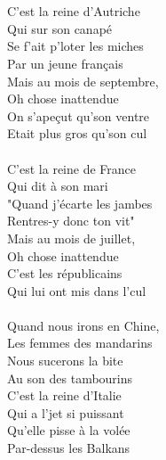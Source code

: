 {\\\\C'est la reine d'Autriche 
\\Qui sur son canapé
\\Se f'ait p'loter les miches 
\\Par un jeune français
\\Mais au mois de septembre, 
\\Oh chose inattendue
\\On s'apeçut qu'son ventre 
\\Etait plus gros qu'son cul
\\\\C'est la reine de France 
\\Qui dit à son mari
\\"Quand j'écarte les jambes 
\\Rentres-y donc ton vit"
\\Mais au mois de juillet, 
\\Oh chose inattendue
\\C'est les républicains 
\\Qui lui ont mis dans l'cul
\\\\Quand nous irons en Chine, 
\\Les femmes des mandarins
\\Nous sucerons la bite 
\\Au son des tambourins
\\C'est la reine d'Italie 
\\Qui a l'jet si puissant
\\Qu'elle pisse à la volée 
\\Par-dessus les Balkans
\\
}
\breakpage